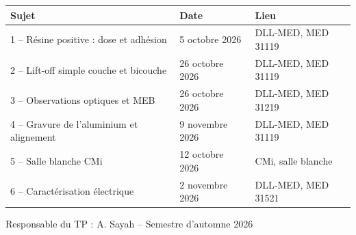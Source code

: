 \begin{titlepage}
  \vspace{1.5cm}
  \begin{tabular}{lll}
    \toprule
    \textbf{Sujet} & \textbf{Date} & \textbf{Lieu} \\
    \midrule
    1 -- Résine positive : dose et adhésion      & 5 octobre 2026  & DLL-MED, MED 31119 \\
    2 -- Lift-off simple couche et bicouche      & 26 octobre 2026 & DLL-MED, MED 31119 \\
    3 -- Observations optiques et MEB            & 26 octobre 2026 & DLL-MED, MED 31219 \\
    4 -- Gravure de l'aluminium et alignement    & 9 novembre 2026 & DLL-MED, MED 31119 \\
    5 -- Salle blanche CMi                       & 12 octobre 2026 & CMi, salle blanche \\
    6 -- Caractérisation électrique              & 2 novembre 2026 & DLL-MED, MED 31521 \\
    \bottomrule
  \end{tabular}



  \vfill
  {Responsable du TP : A. Sayah \quad -- \quad Semestre d'automne 2026\par}
\end{titlepage}
\hypersetup{pageanchor=true}
